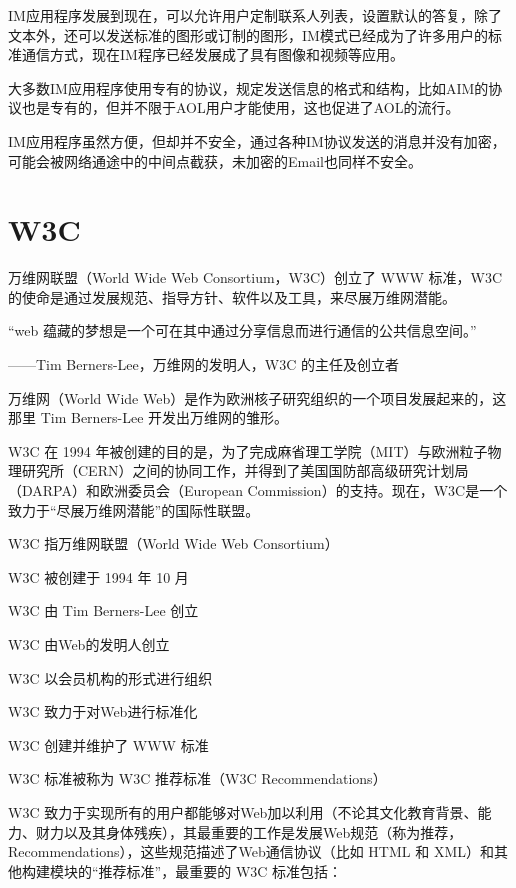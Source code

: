 IM应用程序发展到现在，可以允许用户定制联系人列表，设置默认的答复，除了文本外，还可以发送标准的图形或订制的图形，IM模式已经成为了许多用户的标准通信方式，现在IM程序已经发展成了具有图像和视频等应用。

大多数IM应用程序使用专有的协议，规定发送信息的格式和结构，比如AIM的协议也是专有的，但并不限于AOL用户才能使用，这也促进了AOL的流行。

IM应用程序虽然方便，但却并不安全，通过各种IM协议发送的消息并没有加密，可能会被网络通途中的中间点截获，未加密的Email也同样不安全。

\chapter{W3C}

万维网联盟（World Wide Web Consortium，W3C）创立了 WWW 标准，W3C 的使命是通过发展规范、指导方针、软件以及工具，来尽展万维网潜能。

“web 蕴藏的梦想是一个可在其中通过分享信息而进行通信的公共信息空间。”

\begin{flushright}
——Tim Berners-Lee，万维网的发明人，W3C 的主任及创立者
\end{flushright}

万维网（World Wide Web）是作为欧洲核子研究组织的一个项目发展起来的，这那里 Tim Berners-Lee 开发出万维网的雏形。

W3C 在 1994 年被创建的目的是，为了完成麻省理工学院（MIT）与欧洲粒子物理研究所（CERN）之间的协同工作，并得到了美国国防部高级研究计划局（DARPA）和欧洲委员会（European Commission）的支持。现在，W3C是一个致力于“尽展万维网潜能”的国际性联盟。

\begin{compactitem}
\item W3C 指万维网联盟（World Wide Web Consortium）
\item W3C 被创建于 1994 年 10 月
\item W3C 由 Tim Berners-Lee 创立
\item W3C 由Web的发明人创立
\item W3C 以会员机构的形式进行组织
\item W3C 致力于对Web进行标准化
\item W3C 创建并维护了 WWW 标准
\item W3C 标准被称为 W3C 推荐标准（W3C Recommendations）
\end{compactitem}

W3C 致力于实现所有的用户都能够对Web加以利用（不论其文化教育背景、能力、财力以及其身体残疾），其最重要的工作是发展Web规范（称为推荐，Recommendations），这些规范描述了Web通信协议（比如 HTML 和 XML）和其他构建模块的“推荐标准”，最重要的 W3C 标准包括：

